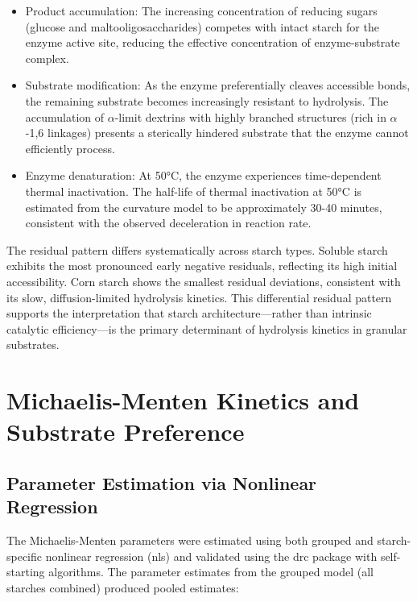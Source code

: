 \documentclass[
  12pt,
]{article}
\begin{document}
\begin{itemize}
\item
  Product accumulation: The increasing concentration of reducing sugars
  (glucose and maltooligosaccharides) competes with intact starch for
  the enzyme active site, reducing the effective concentration of
  enzyme-substrate complex.
\item
  Substrate modification: As the enzyme preferentially cleaves
  accessible bonds, the remaining substrate becomes increasingly
  resistant to hydrolysis. The accumulation of \(\alpha\)-limit dextrins
  with highly branched structures (rich in \(\alpha\)-1,6 linkages)
  presents a sterically hindered substrate that the enzyme cannot
  efficiently process.
\item
  Enzyme denaturation: At 50°C, the enzyme experiences time-dependent
  thermal inactivation. The half-life of thermal inactivation at 50°C is
  estimated from the curvature model to be approximately 30-40 minutes,
  consistent with the observed deceleration in reaction rate.
\end{itemize}

The residual pattern differs systematically across starch types. Soluble
starch exhibits the most pronounced early negative residuals, reflecting
its high initial accessibility. Corn starch shows the smallest residual
deviations, consistent with its slow, diffusion-limited hydrolysis
kinetics. This differential residual pattern supports the interpretation
that starch architecture---rather than intrinsic catalytic
efficiency---is the primary determinant of hydrolysis kinetics in
granular substrates.

\section{Michaelis-Menten Kinetics and Substrate
Preference}\label{michaelis-menten-kinetics-and-substrate-preference}

\subsection{Parameter Estimation via Nonlinear
Regression}\label{parameter-estimation-via-nonlinear-regression}

The Michaelis-Menten parameters were estimated using both grouped and
starch-specific nonlinear regression (nls) and validated using the drc
package with self-starting algorithms. The parameter estimates from the
grouped model (all starches combined) produced pooled estimates:
\end{document}
